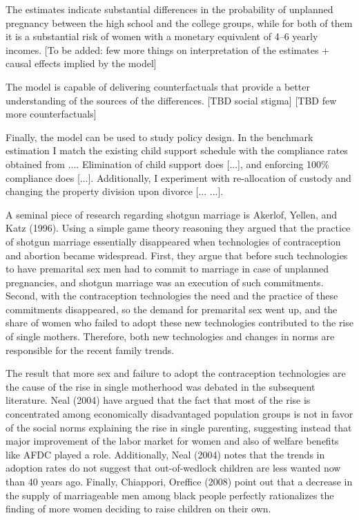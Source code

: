 \documentclass[12pt,letter]{article}
\begin{document}
The estimates indicate substantial differences in the probability of unplanned pregnancy between the high school and the college groups, while for both of them it is a substantial risk of women with a monetary equivalent of 4--6 yearly incomes. [To be added: few more things on interpretation of the estimates + causal effects implied by the model]

The model is capable of delivering counterfactuals that provide a better understanding of the sources of the differences. [TBD social stigma] [TBD few more counterfactuals]

Finally, the model can be used to study policy design. In the benchmark estimation I match the existing child support schedule with the compliance rates obtained from .... Elimination of child support does [...], and enforcing 100\% compliance does [...]. Additionally, I experiment with re-allocation of custody and changing the property division upon divorce [... ...].

A seminal piece of research regarding shotgun marriage is Akerlof, Yellen, and Katz (1996). Using a simple game theory reasoning they argued that the practice of shotgun marriage essentially disappeared when technologies of contraception and abortion became widespread. First, they argue that before such technologies to have premarital sex men had to commit to marriage in case of unplanned pregnancies, and shotgun marriage was an execution of such commitments. Second, with the contraception technologies the need and the practice of these commitments disappeared, so the demand for premarital sex went up, and the share of women who failed to adopt these new technologies contributed to the rise of single mothers. Therefore, both new technologies and changes in norms are responsible for the recent family trends.

The result that more sex and failure to adopt the contraception technologies are the cause of the rise in single motherhood was debated in the subsequent literature. Neal (2004) have argued that the fact that most of the rise is concentrated among economically disadvantaged population groups is not in favor of the social norms explaining the rise in single parenting, suggesting instead that major improvement of the labor market for women and also of welfare benefits like AFDC played a role. Additionally, Neal (2004) notes that the trends in adoption rates do not suggest that out-of-wedlock children are less wanted now than 40 years ago. Finally, Chiappori, Oreffice (2008) point out that a decrease in the supply of marriageable men among black people perfectly rationalizes the finding of more women deciding to raise children on their own.
\end{document}
